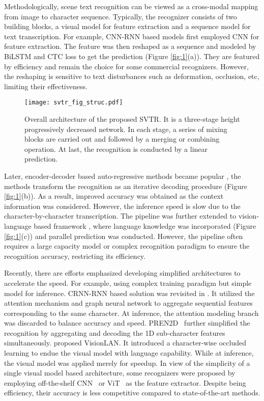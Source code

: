 \documentclass{article}
\begin{document}
Methodologically, scene text recognition can be viewed as a cross-modal mapping from image to character sequence. Typically, the recognizer consists of two building blocks, a visual model for feature extraction and a sequence model for text transcription. For example, CNN-RNN based models \cite{Zhai2016Chpr,shi2017crnn} first employed CNN for feature extraction. The feature was then reshaped as a sequence and modeled by BiLSTM and CTC loss to get the prediction (Figure \ref{fig:1}(a)). They are featured by efficiency and remain the choice for some commercial recognizers. However, the reshaping is sensitive to text disturbances such as deformation, occlusion, etc, limiting their effectiveness.

\begin{figure*}[ht]  
\centering  
\texttt{[image: svtr\_fig\_struc.pdf]}  
\caption{Overall architecture of the proposed SVTR. It is a three-stage height progressively decreased network. In each stage, a series of mixing blocks are carried out and followed by a merging or combining operation. At last, the recognition is conducted by a linear prediction.}  
\label{fig:2}  
\end{figure*}

Later, encoder-decoder based auto-regressive methods became popular \cite{Sheng2019nrtr,li2019sar,zheng2021cdistnet}, the methods transform the recognition as an iterative decoding procedure (Figure \ref{fig:1}(b)).
As a result, improved accuracy was obtained as the context information was considered. However, the inference speed is slow due to the character-by-character transcription. The pipeline was further extended to vision-language based framework \cite{yu2020srn,fang2021abinet}, where language knowledge was incorporated (Figure \ref{fig:1}(c)) and parallel prediction was conducted. However, the pipeline often requires a large capacity model or complex recognition paradigm to ensure the recognition accuracy, restricting its efficiency.





Recently, there are efforts emphasized developing simplified architectures to accelerate the speed. For example, using complex training paradigm but simple model for inference. CRNN-RNN based solution was revisited in \cite{hu2020gtc}. It utilized the attention mechanism and graph neural network to aggregate sequential features corresponding to the same character. At inference, the attention modeling branch was discarded to balance accuracy and speed. PREN2D~\cite{yan2021pren} further simplified the recognition by aggregating and decoding the 1D sub-character features simultaneously. \cite{Wang_2021_visionlan} proposed VisionLAN. It introduced a character-wise occluded learning to endue the visual model with language capability. While at inference, the visual model was applied merely for speedup. In view of the simplicity of a single visual model based architecture, some recognizers were proposed by employing off-the-shelf CNN~\cite{Fedor2018Rosetta} or ViT~\cite{atienza2021vitstr} as the feature extractor. Despite being efficiency, their accuracy is less competitive compared to state-of-the-art methods. 
\end{document}
